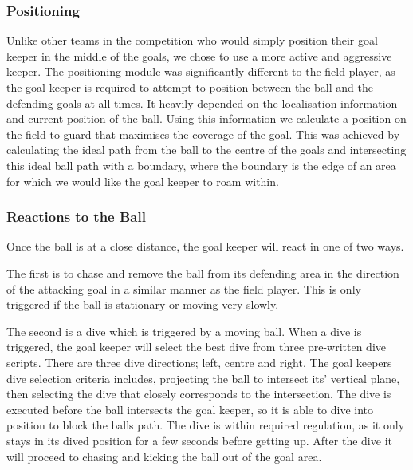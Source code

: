 \subsubsection{Positioning}
Unlike other teams in the competition who would simply position their goal keeper in the middle of the goals, we chose to use a more active and aggressive keeper. The positioning module was significantly different to the field player, as the goal keeper is required to attempt to position between the ball and the defending goals at all times. It heavily depended on the localisation information and current position of the ball. Using this information we calculate a position on the field to guard that maximises the coverage of the goal. This was achieved by calculating the ideal path from the ball to the centre of the goals and intersecting this ideal ball path with a boundary, where the boundary is the edge of an area for which we would like the goal keeper to roam within.


\subsubsection{Reactions to the Ball}
Once the ball is at a close distance, the goal keeper will react in one of two ways. 

The first is to chase and remove the ball from its defending area in the direction of the attacking goal in a similar manner as the field player. This is only triggered if the ball is stationary or moving very slowly.

The second is a dive which is triggered by a moving ball. When a dive is triggered, the goal keeper will select the best dive from three pre-written dive scripts. There are three dive directions; left, centre and right. The goal keepers dive selection criteria includes, projecting the ball to intersect its' vertical plane, then selecting the dive that closely corresponds to the intersection. The dive is executed before the ball intersects the goal keeper, so it is able to dive into position to block the balls path. The dive is within required regulation, as it only stays in its dived position for a few seconds before getting up. After the dive it will proceed to chasing and kicking the ball out of the goal area.
